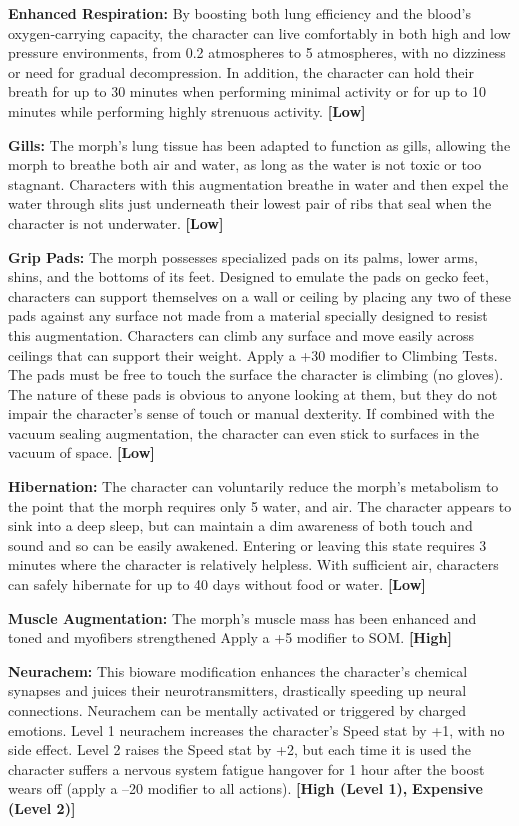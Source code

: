 \textbf{Enhanced Respiration:} By boosting both lung efficiency
and the blood's oxygen-carrying capacity, the
character can live comfortably in both high and low 
pressure environments, from 0.2 atmospheres to 5 
atmospheres, with no dizziness or need for gradual 
decompression. In addition, the character can hold 
their breath for up to 30 minutes when performing 
minimal activity or for up to 10 minutes while performing
highly strenuous activity. \textbf{[Low]}

\textbf{Gills: }The morph's lung tissue has been adapted to 
function as gills, allowing the morph to breathe both 
air and water, as long as the water is not toxic or too 
stagnant. Characters with this augmentation breathe 
in water and then expel the water through slits just 
underneath their lowest pair of ribs that seal when the 
character is not underwater. \textbf{[Low]}

\textbf{Grip Pads: }The morph possesses specialized pads 
on its palms, lower arms, shins, and the bottoms of 
its feet. Designed to emulate the pads on gecko feet, 
characters can support themselves on a wall or ceiling 
by placing any two of these pads against any surface 
not made from a material specially designed to resist 
this augmentation. Characters can climb any surface 
and move easily across ceilings that can support their 
weight. Apply a +30 modifier to Climbing Tests. The 
pads must be free to touch the surface the character is 
climbing (no gloves). The nature of these pads is obvious
to anyone looking at them, but they do not impair
the character's sense of touch or manual dexterity. If 
combined with the vacuum sealing augmentation, the 
character can even stick to surfaces in the vacuum of 
space. \textbf{[Low]}

\textbf{Hibernation:} The character can voluntarily reduce 
the morph's metabolism to the point that the morph 
requires only 5%
water, and air. The character appears to sink into a 
deep sleep, but can maintain a dim awareness of both 
touch and sound and so can be easily awakened. Entering
or leaving this state requires 3 minutes where
the character is relatively helpless. With sufficient 
air, characters can safely hibernate for up to 40 days 
without food or water. \textbf{[Low]}

\textbf{Muscle Augmentation:} The morph's muscle mass 
has been enhanced and toned and myofibers strengthened
Apply a +5 modifier to SOM. \textbf{[High]}

\textbf{Neurachem:} This bioware modification enhances 
the character's chemical synapses and juices their 
neurotransmitters, drastically speeding up neural 
connections. Neurachem can be mentally activated or 
triggered by charged emotions. Level 1 neurachem increases
the character's Speed stat by +1, with no side
effect. Level 2 raises the Speed stat by +2, but each 
time it is used the character suffers a nervous system 
fatigue hangover for 1 hour after the boost wears off 
(apply a –20 modifier to all actions). \textbf{[High (Level 1), }
\textbf{Expensive (Level 2)]}

